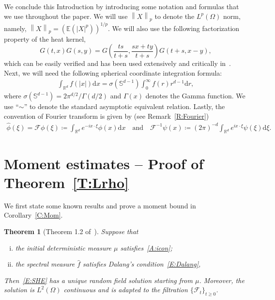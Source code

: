 \documentclass[a4paper,11pt]{article}%
\theoremstyle{plain}
\newtheorem{theorem}{Theorem}[section]
\theoremstyle{definition}
\numberwithin{equation}{section}
\newcommand{\R}{\mathbb{R}}
\newcommand{\Norm}[1]{\left\| #1 \right\|}
\newcommand{\ud}{\ensuremath{\mathrm{d}}}
\begin{document}
\bigskip

We conclude this Introduction by introducing some notation and formulas that we use throughout the
paper. We will use $\Norm{X}_p$ to denote the $L^p (\Omega)$ norm, namely,
$\Norm{X}_p = \left(\mathbb{E}(|X|^p)\right)^{1/p}$. We will also use the following factorization
property of the heat kernel,
\begin{equation}\label{E:gsim}
  G(t,x)G(s,y) = G\left(\frac{ts}{t+s}, \frac{sx + ty}{t+s}\right)G\left(t+s, x-y\right),
\end{equation}
which can be easily verified and has been used extensively and critically
in~\cite{chen.dalang:15:moments*1,chen.kim:19:nonlinear,chen.huang:19:comparison}. Next, we will
need the following spherical coordinate integration formula:
\begin{align*}
  \int_{\R^d} f(|x|) \ud x = \sigma(\mathbb{S}^{d-1}) \int_0^\infty f(r) r^{d-1} \ud r,
\end{align*}
where $\sigma(\mathbb{S}^{d-1}) = 2\pi^{d/2} / \Gamma(d/2)$ and $\Gamma(x)$ denotes the Gamma
function. We use ``$\sim$'' to denote the standard asymptotic equivalent relation. Lastly, the
convention of Fourier transform is given by (see Remark~\ref{R:Fourier})
\begin{align}\label{E:Fourier}
  \widehat{\phi}(\xi) = \mathcal{F}\phi(\xi) \coloneqq \int_{\R^d} e^{-i x\cdot\xi} \phi(x)\ud x \quad \text{and} \quad
  \mathcal{F}^{-1}\psi(x) \coloneqq (2\pi)^{-d} \int_{\R^d} e^{i x\cdot\xi} \psi(\xi)\ud \xi.
\end{align}

\section{Moment estimates -- Proof of Theorem~\ref{T:Lrho}}\label{S:Lrho}
We first state some known results and prove a moment bound in Corollary~\ref{C:Mom}.

\begin{theorem}[Theorem 1.2 of~\cite{chen.huang:19:comparison}]\label{T:Solve}
  Suppose that
  \begin{enumerate}[(i)]
   \item the initial deterministic measure $\mu$ satisfies~\eqref{A:icon};
   \item the spectral measure $\widehat{f}$ satisfies \textit{Dalang's condition}~\eqref{E:Dalang},
  \end{enumerate}
  Then~\eqref{E:SHE} has a unique random field solution starting from $\mu$. Moreover, the solution
  is $L^2 (\Omega)$ continuous and is adapted to the filtration $\{\mathcal{F}_t\}_{t\ge 0}$.
\end{theorem}
\end{document}
